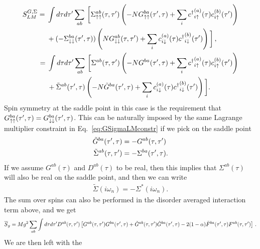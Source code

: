 \begin{align}
    \begin{split}
        S_{LM}^{G,\Sigma} ={}& \int d\tau d\tau^\prime\sum_{ab} \, \bigg[\Sigma^{ab}_{\uparrow\uparrow}(\tau,\tau^\prime)\left(-NG^{ba}_{\uparrow\uparrow}(\tau^\prime,\tau) + \sum_i {c^\dagger}^{(a)}_{i\uparrow}(\tau)c^{(b)}_{i\uparrow}(\tau^\prime)\right) \\ 
        & + (-\Sigma^{ba}_{\downarrow\downarrow}(\tau^\prime,\tau))\left(NG^{ab}_{\downarrow\downarrow}(\tau,\tau^\prime) + \sum_i c^{(a)}_{i\downarrow}(\tau){c^\dagger}^{(b)}_{i\downarrow}(\tau^\prime)\right)  \bigg] \, ,
    \end{split} \\
    \begin{split}
        ={}& \int d\tau d\tau^\prime\sum_{ab} \, \bigg[\Sigma^{ab}(\tau,\tau^\prime)\left(-NG^{ba}(\tau^\prime,\tau) + \sum_i {c^\dagger}^{(a)}_{i\uparrow}(\tau)c^{(b)}_{i\uparrow}(\tau^\prime)\right) \\ 
        & + \tilde{\Sigma}^{ab}(\tau^\prime,\tau)\left(-N\tilde{G}^{ba}(\tau^\prime,\tau) + \sum_i c^{(a)}_{i\downarrow}(\tau){c^\dagger}^{(b)}_{i\downarrow}(\tau^\prime)\right)  \bigg]. \label{eq:GSigmaLMconstr}
    \end{split}
\end{align}
%
Spin symmetry at the saddle point in this case is the requirement that $G^{ba}_{\uparrow\uparrow}(\tau^\prime,\tau) = G^{ba}_{\downarrow\downarrow}(\tau^\prime,\tau) $. This can be naturally imposed by the same Lagrange multiplier constraint in Eq.~\eqref{eq:GSigmaLMconstr} if we pick on the saddle point
\begin{align}
    \tilde{G}^{ba}(\tau^\prime,\tau) &= -G^{ab}(\tau,\tau^\prime)  \\
    \tilde{\Sigma}^{ab}(\tau,\tau^\prime) &= -\Sigma^{ba}(\tau^\prime,\tau).
\end{align}
%
If we assume $G^{ab}(\tau)$ and $D^{ab}(\tau)$ to be real, 
then this implies that $\Sigma^{ab}(\tau)$ will also be real on the saddle point, and then we can write
\begin{align}
    \tilde{\Sigma}(i\omega_n) = -\Sigma^\ast(i\omega_n).
\end{align}
%
The sum over spins can also be performed in the disorder averaged interaction term above, and we get
\begin{align}
    \overline{S}_g = M g^2 \sum_{ab}\int d\tau d\tau^\prime D^{ab}(\tau,\tau^\prime)\left[G^{ab}(\tau,\tau^\prime)G^{ba}(\tau^\prime,\tau) + \tilde{G}^{ab}(\tau,\tau^\prime)\tilde{G}^{ba}(\tau^\prime,\tau) - 2(1-\alpha)\Bar{F}^{ba}(\tau^\prime,\tau)F^{ab}(\tau,\tau^\prime)\right] \,.
\end{align}
%
We are then left with the 

